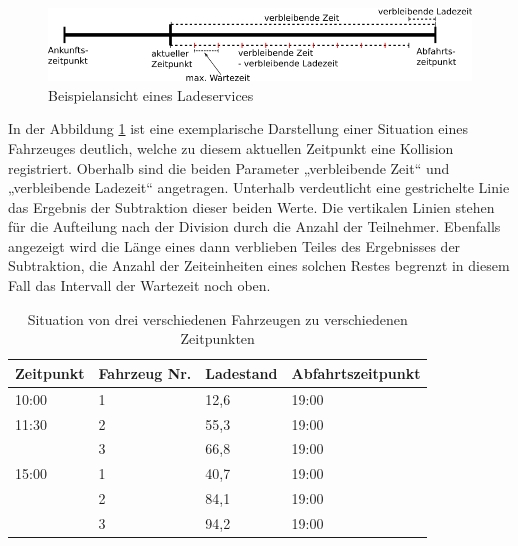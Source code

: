 \begin{figure}[htb]
	\includegraphics[width = \linewidth]{img/SA_waiting_Graph4.png}
	\caption{Beispielansicht eines Ladeservices}
	\label{SAWait:Graph}
\end{figure}

In der Abbildung \ref{SAWait:Graph} ist eine exemplarische Darstellung einer Situation eines Fahrzeuges deutlich, welche zu diesem aktuellen  Zeitpunkt eine Kollision registriert. Oberhalb sind die beiden Parameter „verbleibende Zeit“ und „verbleibende Ladezeit“ angetragen. Unterhalb verdeutlicht eine gestrichelte Linie das Ergebnis der Subtraktion dieser beiden Werte. Die vertikalen Linien stehen für die Aufteilung nach der Division durch die Anzahl der Teilnehmer. Ebenfalls angezeigt wird die Länge eines dann verblieben Teiles des Ergebnisses der Subtraktion, die Anzahl der Zeiteinheiten eines solchen Restes begrenzt in diesem Fall das Intervall der Wartezeit noch oben.\\
\begin{table}[htb]
\centering
\begin{tabular}{|l|l|l|l|}
\hline
Zeitpunkt & Fahrzeug Nr. & Ladestand & Abfahrtszeitpunkt \\ \hline \hline
10:00     & 1            & 12,6      & 19:00             \\ \hline
11:30     & 2            & 55,3      & 19:00             \\ \hline
          & 3            & 66,8      & 19:00             \\ \hline
15:00     & 1            & 40,7      & 19:00             \\ \hline
          & 2            & 84,1      & 19:00             \\ \hline
          & 3            & 94,2      & 19:00             \\ \hline
\end{tabular}
\caption{Situation von drei verschiedenen Fahrzeugen zu verschiedenen Zeitpunkten}
\label{tab:example2}
\end{table}

